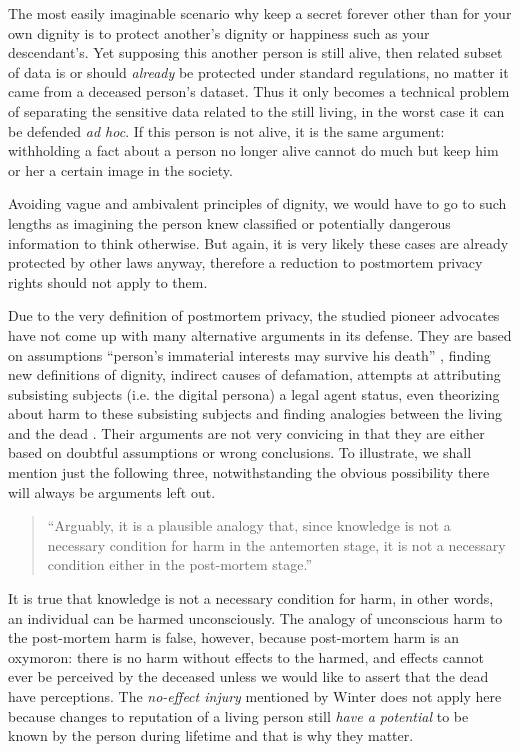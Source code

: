 The most easily imaginable scenario why keep a secret forever other than for your own dignity is to protect another's dignity or happiness such as your descendant's. Yet supposing this another person is still alive, then related subset of data is or should \emph{already} be protected under standard regulations, no matter it came from a deceased person's dataset. Thus it only becomes a technical problem of separating the sensitive data related to the still living, in the worst case it can be defended \emph{ad hoc}. If this person is not alive, it is the same argument: withholding a fact about a person no longer alive cannot do much but keep him or her a certain image in the society.

Avoiding vague and ambivalent principles of dignity, we would have to go to such lengths as imagining the person knew classified or potentially dangerous information to think otherwise. But again, it is very likely these cases are already protected by other laws anyway, therefore a reduction to postmortem privacy rights should not apply to them.

Due to the very definition of postmortem privacy, the studied pioneer advocates have not come up with many alternative arguments in its defense. They are based on assumptions ``person's immaterial interests may survive his death'' \cite{buitelaar}, finding new definitions of dignity, indirect causes of defamation, attempts at attributing subsisting subjects (i.e. the digital persona) a legal agent status, even theorizing about harm to these subsisting subjects and finding analogies between the living and the dead \cite{buitelaar, harbinja2}. Their arguments are not very convicing in that they are either based on doubtful assumptions or wrong conclusions. To illustrate, we shall mention just the following three, notwithstanding the obvious possibility there will always be arguments left out.

\begin{quote}
    ``Arguably, it is a plausible analogy that, since knowledge is not a necessary condition for harm in the antemorten stage, it is not a necessary condition either in the post-mortem stage.'' \cite[p. 133]{buitelaar}
\end{quote}

It is true that knowledge is not a necessary condition for harm, in other words, an individual can be harmed unconsciously.
The analogy of unconscious harm to the post-mortem harm is false, however, because post-mortem harm is an oxymoron: there is no harm without effects to the harmed, and effects cannot ever be perceived by the deceased unless we would like to assert that the dead have perceptions. The \textit{no-effect injury} \cite{winter} mentioned by Winter does not apply here because changes to reputation of a living person still \emph{have a potential} to be known by the person during lifetime and that is why they matter.

